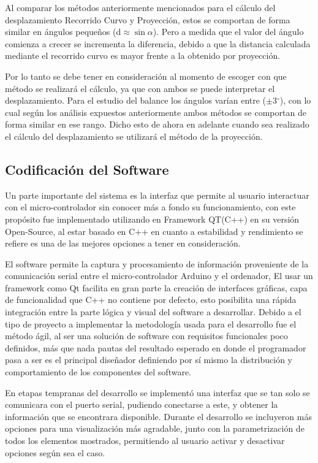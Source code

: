 \documentclass[12pt,a4paper]{article}
\newcommand{\grad}{$^{\circ}$}
\begin{document}
Al comparar los métodos anteriormente mencionados para el cálculo del desplazamiento Recorrido Curvo y Proyección, estos se comportan de forma similar en ángulos pequeños (d$\approx\sin\alpha$). Pero a medida que el valor del ángulo comienza a crecer se incrementa la diferencia, debido a que la distancia calculada mediante el recorrido curvo es mayor frente a la obtenido por proyección.

Por lo tanto se debe tener en consideración al momento de escoger con que método se realizará el cálculo, ya que con ambos se puede interpretar el desplazamiento. Para el estudio del balance los ángulos varían entre ($\pm 3$\grad), con lo cual según los análisis expuestos anteriormente ambos métodos se comportan de forma similar en ese rango.
Dicho esto de ahora en adelante cuando sea realizado el cálculo del desplazamiento se utilizará el método de la proyección.


\newpage
\subsection{Codificación del Software}
Un parte importante del sistema es la interfaz que permite al usuario interactuar con el micro-controlador sin conocer más a fondo su funcionamiento,
con este propósito fue implementado utilizando en Framework QT(C++)\cite{QT} en su versión Open-Source, al estar basado en C++ en cuanto a estabilidad y rendimiento se refiere es una de las mejores opciones a tener en consideración.

El software permite la captura y procesamiento de información proveniente de la comunicación serial entre el micro-controlador Arduino y el ordenador,
El usar un framework como Qt facilita en gran parte la creación de interfaces gráficas, capa de funcionalidad que C++ no contiene por defecto, esto posibilita una rápida integración entre la parte lógica y visual del software a desarrollar.
Debido a el tipo de proyecto a implementar la metodología usada para el desarrollo fue el método ágil, al ser una solución de software con requisitos funcionales poco definidos, más que nada pautas del resultado esperado en donde el programador pasa a ser es el principal diseñador definiendo por sí mismo la distribución y comportamiento de los componentes del software.

En etapas tempranas del desarrollo se implementó una interfaz que se tan solo se comunicara con el puerto serial, pudiendo conectarse a este, y obtener la información que se encontrara disponible.
Durante el desarrollo se incluyeron más opciones para una visualización más agradable, junto con la parametrización de todos los elementos mostrados, permitiendo al usuario activar y desactivar opciones según sea el caso.
\end{document}

